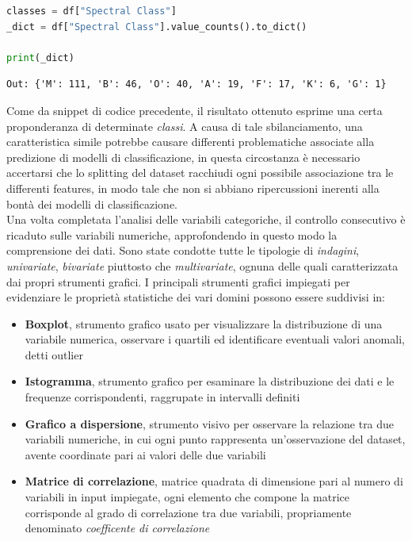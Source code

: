 \documentclass{article}
\begin{document}
    \begin{lstlisting}[language=Python]
classes = df["Spectral Class"]
_dict = df["Spectral Class"].value_counts().to_dict()

print(_dict)
    \end{lstlisting}
    \begin{lstlisting}[style=Jupyter]
Out: {'M': 111, 'B': 46, 'O': 40, 'A': 19, 'F': 17, 'K': 6, 'G': 1}
    \end{lstlisting}
    Come da snippet di codice precedente, il risultato ottenuto esprime una certa proponderanza di determinate \textit{classi}. A causa di tale sbilanciamento, una caratteristica simile potrebbe causare differenti problematiche associate alla predizione di modelli di classificazione, in questa circostanza è necessario accertarsi che lo splitting del dataset racchiudi ogni possibile associazione tra le differenti features, in modo tale che non si abbiano ripercussioni inerenti alla bontà dei modelli di classificazione. \vspace*{7pt}\\
    Una volta completata l'analisi delle variabili categoriche, il controllo consecutivo è ricaduto sulle variabili numeriche, approfondendo in questo modo la comprensione dei dati. Sono state condotte tutte le tipologie di \textit{indagini}, \textit{univariate}, \textit{bivariate} piuttosto che \textit{multivariate}, ognuna delle quali caratterizzata dai propri strumenti grafici. I principali strumenti grafici impiegati per evidenziare le proprietà statistiche dei vari domini possono essere suddivisi in:
     \begin{itemize}
        \renewcommand{\labelitemi}{-}
        \setlength\parskip{0pt}
        \item \textbf{Boxplot}, strumento grafico usato per visualizzare la distribuzione di una variabile numerica, osservare i quartili ed identificare eventuali valori anomali, detti outlier
        \item \textbf{Istogramma}, strumento grafico per esaminare la distribuzione dei dati e le frequenze corrispondenti, raggrupate in intervalli definiti
        \item \textbf{Grafico a dispersione}, strumento visivo per osservare la relazione tra due variabili numeriche, in cui ogni punto rappresenta un'osservazione del dataset, avente coordinate pari ai valori delle due variabili
        \item \textbf{Matrice di correlazione}, matrice quadrata di dimensione pari al numero di variabili in input impiegate, ogni elemento che compone la matrice corrisponde al grado di correlazione tra due variabili, propriamente denominato \textit{coefficente di correlazione}
    \end{itemize}
\end{document}
